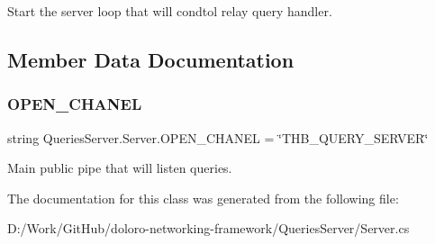 Start the server loop that will condtol relay query handler. 



\subsection{Member Data Documentation}
\mbox{\label{class_queries_server_1_1_server_a5d7c4c9ababa7292ef7cac92005d3563}} 
\subsubsection{\texorpdfstring{O\+P\+E\+N\+\_\+\+C\+H\+A\+N\+EL}{OPEN\_CHANEL}}
{\footnotesize\ttfamily string Queries\+Server.\+Server.\+O\+P\+E\+N\+\_\+\+C\+H\+A\+N\+EL = \char`\"{}T\+H\+B\+\_\+\+Q\+U\+E\+R\+Y\+\_\+\+S\+E\+R\+V\+ER\char`\"{}\hspace{0.3cm}{\ttfamily [static]}}



Main public pipe that will listen queries. 



The documentation for this class was generated from the following file\+:\begin{DoxyCompactItemize}
\item 
D\+:/\+Work/\+Git\+Hub/doloro-\/networking-\/framework/\+Queries\+Server/Server.\+cs\end{DoxyCompactItemize}
